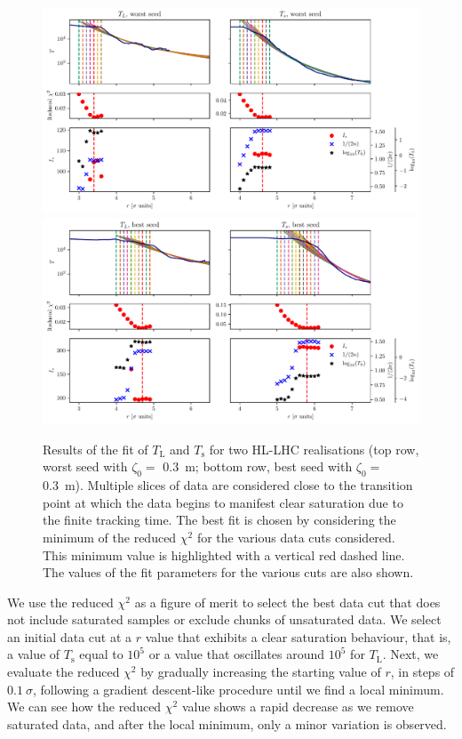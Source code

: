 \begin{figure}[htb]
    \centering
    \includegraphics[width=1\textwidth]{6_lhc_dynamic_indicators/figs/updated/fit_l_time_bad.pdf}
    \includegraphics[width=1\textwidth]{6_lhc_dynamic_indicators/figs/updated/fit_l_time_best.pdf}
    \caption{Results of the fit of $T_\mathrm{L}$ and $T_\mathrm{s}$ for two HL-LHC realisations (top row, worst seed with $\zeta_0=$ \SI{0.3}{\meter}; bottom row, best seed with $\zeta_0=$ \SI{0.3}{\meter}). Multiple slices of data are considered close to the transition point at which the data begins to manifest clear saturation due to the finite tracking time. The best fit is chosen by considering the minimum of the reduced $\chi^2$ for the various data cuts considered. This minimum value is highlighted with a vertical red dashed line. The values of the fit parameters for the various cuts are also shown.}
    \label{fig:the_lyap_fit}
\end{figure}

We use the reduced $\chi^2$ as a figure of merit to select the best data cut that does not include saturated samples or exclude chunks of unsaturated data. We select an initial data cut at a $r$ value that exhibits a clear saturation behaviour, that is, a value of $T_\mathrm{s}$ equal to $10^5$ or a value that oscillates around $10^5$ for $T_\mathrm{L}$. Next, we evaluate the reduced $\chi^2$ by gradually increasing the starting value of $r$, in steps of $0.1\ \sigma$, following a gradient descent-like procedure until we find a local minimum. We can see how the reduced $\chi^2$ value shows a rapid decrease as we remove saturated data, and after the local minimum, only a minor variation is observed.

